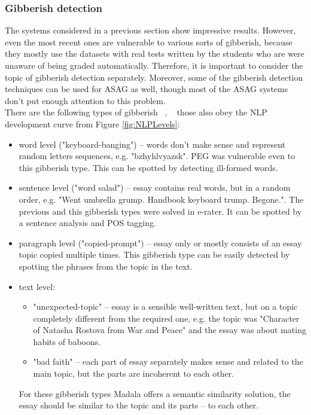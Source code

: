 \subsubsection{Gibberish detection}

The systems considered in a previous section show impressive results. However, even the most recent ones are vulnerable to various sorts of gibberish, because they mostly use the datasets with real tests written by the students who are were unaware of being graded automatically. Therefore, it is important to consider the topic of gibberish detection separately. Moreover, some of the gibberish detection techniques can be used for ASAG as well, though most of the ASAG systems don't put enough attention to this problem.\\

There are the following types of gibberish ~\cite{gibberishShermis}, ~\cite{gibberish} those also obey the NLP development curve from Figure \ref{fig:NLPLevels}:
\begin{itemize}
\item word level ("keyboard-banging") -- words don't make sense and represent random letters sequences, e.g. "bzhyhlvyazsk". PEG was vulnerable even to this gibberish type. This can be spotted by detecting ill-formed words.
\item sentence level ("word salad") -- essay contains real words, but in a random order, e.g. "Went umbrella grump. Handbook keyboard trump. Begone.". The previous and this gibberish types were solved in e-rater. It can be spotted by a sentence analysis and POS tagging.
\item paragraph level ("copied-prompt") -- essay only or mostly consists of an essay topic copied multiple times. This gibberish type can be easily detected by spotting the phrases from the topic in the text.
\item text level:
\begin{itemize}
\item "unexpected-topic" -- essay is a sensible well-written text, but on a topic completely different from the required one, e.g. the topic was "Character of Natasha Rostova from War and Peace" and the essay was about mating habits of baboons.
\item "bad faith" -- each part of essay separately makes sense and related to the main topic, but the parts are incoherent to each other.
\end{itemize}
For these gibberish types Madala offers a semantic similarity solution, the essay should be similar to the topic and its parts -- to each other.
\end{itemize}

